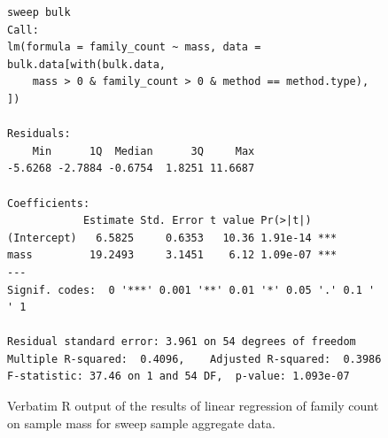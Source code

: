 \documentclass[10pt,letterpaper,twocolumn]{article}
\begin{document}
\begin{figure}[h]
	\lstset{numbers=left}
	\lstset{xleftmargin=5mm,framexleftmargin=5mm}
	\begin{lstlisting}
sweep bulk
Call:
lm(formula = family_count ~ mass, data = bulk.data[with(bulk.data, 
    mass > 0 & family_count > 0 & method == method.type), ])

Residuals:
    Min      1Q  Median      3Q     Max 
-5.6268 -2.7884 -0.6754  1.8251 11.6687 

Coefficients:
            Estimate Std. Error t value Pr(>|t|)    
(Intercept)   6.5825     0.6353   10.36 1.91e-14 ***
mass         19.2493     3.1451    6.12 1.09e-07 ***
---
Signif. codes:  0 '***' 0.001 '**' 0.01 '*' 0.05 '.' 0.1 ' ' 1

Residual standard error: 3.961 on 54 degrees of freedom
Multiple R-squared:  0.4096,	Adjusted R-squared:  0.3986 
F-statistic: 37.46 on 1 and 54 DF,  p-value: 1.093e-07
	\end{lstlisting}
	\caption{Verbatim R output of the results of linear regression of family count on sample mass for sweep sample aggregate data.}
	\label{fig:bulk_sweep_lm}
	\smallskip
	\nointerlineskip
	\hrulefill
\end{figure}
\end{document}
